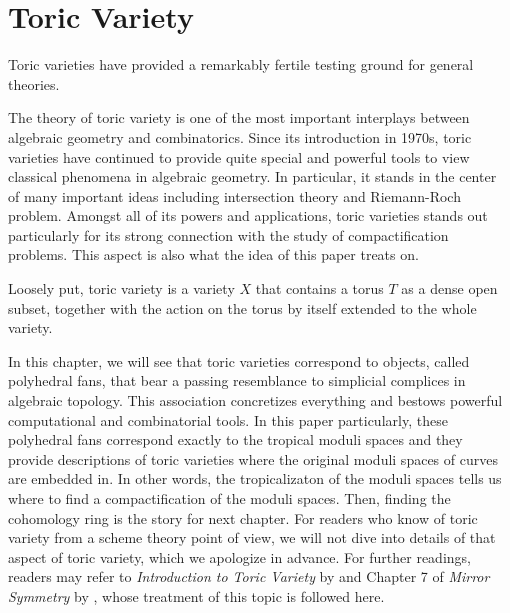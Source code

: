 \chapter{Toric Variety}
\label{chp:toric-variety}

\epigraph{
Toric varieties have provided a remarkably fertile testing ground for general theories.
}{\citet{Fulton1993}}

The theory of toric variety is one of the most important interplays 
between algebraic geometry and combinatorics. 
Since its introduction in 1970s, toric varieties have continued to provide 
quite special and powerful tools to view classical phenomena 
in algebraic geometry.
In particular, it stands in the center of many important ideas 
including intersection theory and Riemann-Roch problem.
Amongst all of its powers and applications, 
toric varieties stands out particularly for its strong connection with 
the study of compactification problems. 
This aspect is also what the idea of this paper treats on. 

Loosely put, toric variety is a variety $X$
that contains a torus $T$ as a dense open subset,
together with the action on the torus by itself extended to the whole variety.

In this chapter, we will see that toric varieties correspond to objects,
called polyhedral fans,
that bear a passing resemblance to simplicial complices in algebraic topology.
This association concretizes everything and bestows powerful computational and combinatorial tools.
In this paper particularly, 
these polyhedral fans correspond exactly to the tropical moduli spaces
and they provide descriptions of toric varieties 
where the original moduli spaces of curves are embedded in.
In other words, the tropicalizaton of the moduli spaces 
tells us where to find a compactification of the moduli spaces. 
Then, finding the cohomology ring is the story for next chapter.
For readers who know of toric variety from a scheme theory point of view,
we will not dive into details of that aspect of toric variety,
which we apologize in advance. 
For further readings, readers may refer to 
\emph{Introduction to Toric Variety} by \citet{Fulton1993} 
and Chapter 7 of \emph{Mirror Symmetry} by \citet{Hori2003},
whose treatment of this topic is followed here. 